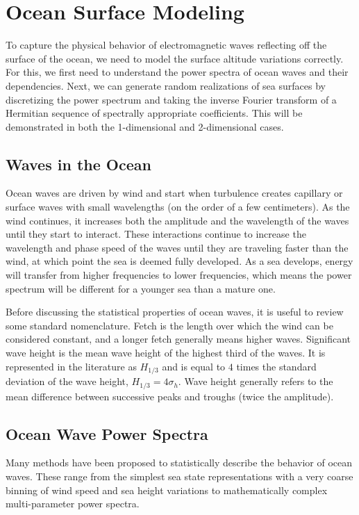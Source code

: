 \renewcommand{\baselinestretch}{2} \small\normalsize
\chapter{Ocean Surface Modeling}
To capture the physical behavior of electromagnetic waves reflecting off the surface of the ocean, we need to model the surface altitude variations correctly. For this, we first need to understand the power spectra of ocean waves and their dependencies. Next, we can generate random realizations of sea surfaces by discretizing the power spectrum and taking the inverse Fourier transform of a Hermitian sequence of spectrally appropriate coefficients. This will be demonstrated in both the 1-dimensional and 2-dimensional cases.

\section {Waves in the Ocean}
Ocean waves are driven by wind and start when turbulence creates capillary or surface waves with small wavelengths (on the order of a few centimeters). As the wind continues, it increases both the amplitude and the wavelength of the waves until they start to interact. These interactions continue to increase the wavelength and phase speed of the waves until they are traveling faster than the wind, at which point the sea is deemed fully developed. As a sea develops, energy will transfer from higher frequencies to lower frequencies, which means the power spectrum will be different for a younger sea than a mature one.

Before discussing the statistical properties of ocean waves, it is useful to review some standard nomenclature. Fetch is the length over which the wind can be considered constant, and a longer fetch generally means higher waves. Significant wave height is the mean wave height of the highest third of the waves. It is represented in the literature as $H_{1/3}$ and is equal to $4$ times the standard deviation of the wave height, $H_{1/3} = 4\sigma_h$. Wave height generally refers to the mean difference between successive peaks and troughs (twice the amplitude).

\section{Ocean Wave Power Spectra}  \label{os_sec:power_spectra}
Many methods have been proposed to statistically describe the behavior of ocean waves. These range from the simplest sea state representations with a very coarse binning of wind speed and sea height variations to mathematically complex multi-parameter power spectra.

